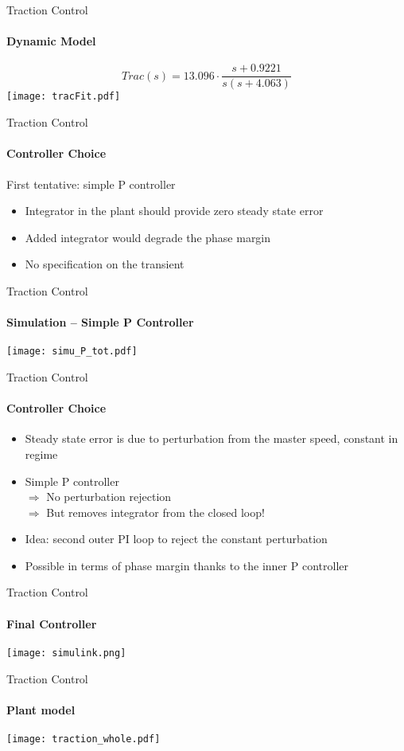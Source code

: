 \begin{frame}{Traction Control}
  \framesubtitle{Dynamic Model}
\[Trac(s) = 13.096\cdot\frac{s+0.9221}{s(s+4.063)}\]
\texttt{[image: tracFit.pdf]}
\end{frame}

\begin{frame}{Traction Control}
\framesubtitle{Controller Choice}
\begin{block}{First tentative: simple P controller}
\begin{itemize}
\item Integrator in the plant should provide zero steady state error
\item Added integrator would degrade the phase margin
\item No specification on the transient
\end{itemize}
\end{block}
\end{frame}

\begin{frame}{Traction Control}
\centering
\framesubtitle{Simulation -- Simple P Controller}
\texttt{[image: simu\_P\_tot.pdf]}
\end{frame}

\begin{frame}{Traction Control}
\framesubtitle{Controller Choice}
\begin{itemize}
\item Steady state error is due to perturbation from the master speed, constant in regime
\item Simple P controller
\\$\Rightarrow$ No perturbation rejection
\\$\Rightarrow$ But removes integrator from the closed loop!
\item Idea: second outer PI loop to reject the constant perturbation
\item Possible in terms of phase margin thanks to the inner P controller
\end{itemize}
\end{frame}

\begin{frame}{Traction Control}
\framesubtitle{Final Controller}
\texttt{[image: simulink.png]}
\end{frame}

\begin{frame}{Traction Control}
\framesubtitle{Plant model}
\texttt{[image: traction\_whole.pdf]}
\end{frame}

